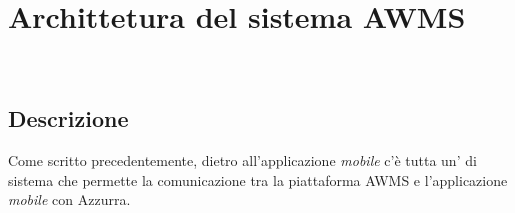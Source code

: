 \chapter{Archittetura del sistema AWMS}
\label{cap:archittettura del sistema AWMS}

\\


\section{Descrizione}
Come scritto precedentemente, dietro all'applicazione \emph{mobile} c'è tutta un' di sistema che permette la comunicazione tra la piattaforma \gls{AWMS} e l'applicazione \emph{mobile} con Azzurra.
 
